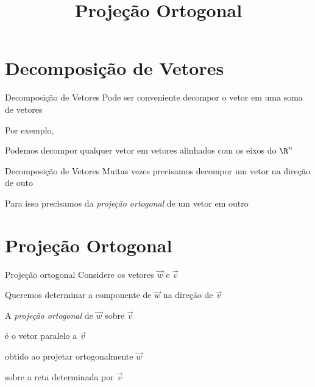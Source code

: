 \documentclass[fleqn,aspectratio=169,12pt]{beamer}
\title{Projeção Ortogonal}
\begin{document}
\addtitle

\section{Decomposição de Vetores}

\begin{frame}{Decomposição de Vetores}
  Pode ser conveniente decompor o vetor em uma soma de vetores

  \pause
  \bigskip
  Por exemplo,

  \pause
  Podemos decompor qualquer vetor em vetores alinhados com os eixos do $\R^n$
\end{frame}


\begin{frame}{Decomposição de Vetores}
  Muitas vezes precisamos decompor um vetor na direção de outo

  \pause
  \bigskip
  Para isso precisamos da \emph{projeção ortogonal} de um vetor em outro
\end{frame}


\section{Projeção Ortogonal}

\begin{frame}{Projeção ortogonal}
  Considere os vetores $\vec{w}$ e $\vec{v}$

  \pause
  Queremos determinar a componente de $\vec{w}$ na direção de $\vec{v}$

  \pause
  A \emph{projeção ortogonal} de $\vec{w}$ sobre $\vec{v}$

  \pause
  é o vetor paralelo a $\vec{v}$

  \pause
  obtido ao projetar ortogonalmente $\vec{w}$

  \pause
  sobre a reta determinada por $\vec{v}$
\end{frame}
\end{document}
